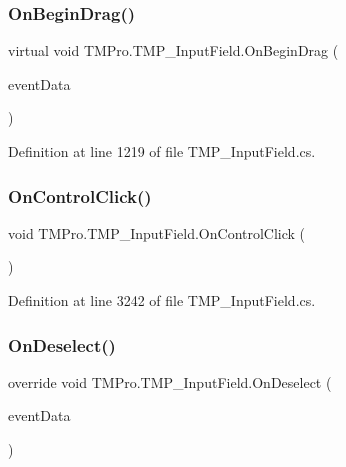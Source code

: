 \subsubsection{\texorpdfstring{OnBeginDrag()}{OnBeginDrag()}}
{\footnotesize\ttfamily virtual void T\+M\+Pro.\+T\+M\+P\+\_\+\+Input\+Field.\+On\+Begin\+Drag (\begin{DoxyParamCaption}\item[{Pointer\+Event\+Data}]{event\+Data }\end{DoxyParamCaption})\hspace{0.3cm}{\ttfamily [virtual]}}



Definition at line 1219 of file T\+M\+P\+\_\+\+Input\+Field.\+cs.

\mbox{\label{class_t_m_pro_1_1_t_m_p___input_field_a6b3e476c9e6b55214549999eedb4ff09}} 
\subsubsection{\texorpdfstring{OnControlClick()}{OnControlClick()}}
{\footnotesize\ttfamily void T\+M\+Pro.\+T\+M\+P\+\_\+\+Input\+Field.\+On\+Control\+Click (\begin{DoxyParamCaption}{ }\end{DoxyParamCaption})}



Definition at line 3242 of file T\+M\+P\+\_\+\+Input\+Field.\+cs.

\mbox{\label{class_t_m_pro_1_1_t_m_p___input_field_a4408fce00917fd765ef1a1e5017a3464}} 
\subsubsection{\texorpdfstring{OnDeselect()}{OnDeselect()}}
{\footnotesize\ttfamily override void T\+M\+Pro.\+T\+M\+P\+\_\+\+Input\+Field.\+On\+Deselect (\begin{DoxyParamCaption}\item[{Base\+Event\+Data}]{event\+Data }\end{DoxyParamCaption})}



